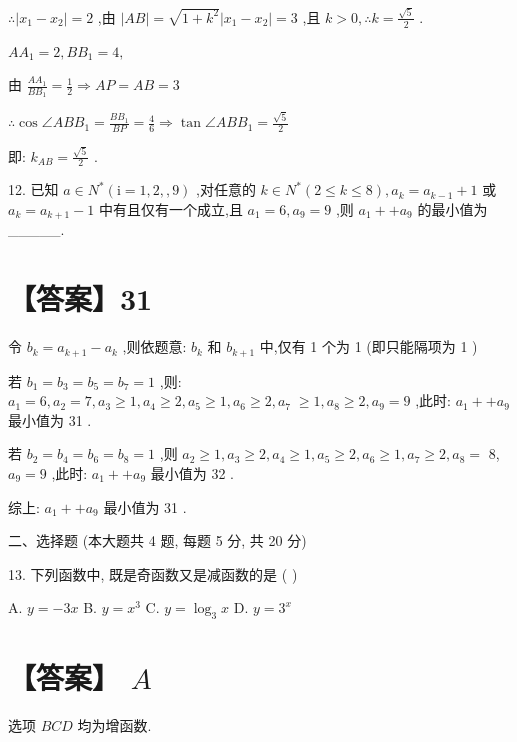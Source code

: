 \documentclass[10pt]{article}
\begin{document}
\(\therefore \left| {{x}_{1} - {x}_{2}}\right|  = 2\) ,由 \(\left| {AB}\right|  = \sqrt{1 + {k}^{2}}\left| {{x}_{1} - {x}_{2}}\right|  = 3\) ,且 \(k > 0,\therefore k = \frac{\sqrt{5}}{2}\) .

\(A{A}_{1} = 2,B{B}_{1} = 4,\)

由 \(\frac{A{A}_{1}}{B{B}_{1}} = \frac{1}{2} \Rightarrow  {AP} = {AB} = 3\)

\(\therefore \cos \angle {AB}{B}_{1} = \frac{B{B}_{1}}{BP} = \frac{4}{6} \Rightarrow  \tan \angle {AB}{B}_{1} = \frac{\sqrt{5}}{2}\)

即: \({k}_{AB} = \frac{\sqrt{5}}{2}\) .

12. 已知 \(a \in  {N}^{ * }\left( {\mathrm{i} = 1,2,,9}\right)\) ,对任意的 \(k \in  {N}^{ * }\left( {2 \leq  k \leq  8}\right) ,{a}_{k} = {a}_{k - 1} + 1\) 或 \({a}_{k} = {a}_{k + 1} - 1\) 中有且仅有一个成立,且 \({a}_{1} = 6,{a}_{9} = 9\) ,则 \({a}_{1} +  + {a}_{9}\) 的最小值为\_\_\_\_\_.

\section*{【答案】31}

令 \({b}_{k} = {a}_{k + 1} - {a}_{k}\) ,则依题意: \({b}_{k}\) 和 \({b}_{k + 1}\) 中,仅有 1 个为 1 (即只能隔项为 1 )

若 \({b}_{1} = {b}_{3} = {b}_{5} = {b}_{7} = 1\) ,则: \({a}_{1} = 6,{a}_{2} = 7,{a}_{3} \geq  1,{a}_{4} \geq  2,{a}_{5} \geq  1,{a}_{6} \geq  2,{a}_{7} \; \geq  1,{a}_{8} \geq  2,{a}_{9} = 9\) ,此时: \({a}_{1} +  + {a}_{9}\) 最小值为 31 .

若 \({b}_{2} = {b}_{4} = {b}_{6} = {b}_{8} = 1\) ,则 \({a}_{2} \geq  1,{a}_{3} \geq  2,{a}_{4} \geq  1,{a}_{5} \geq  2,{a}_{6} \geq  1,{a}_{7} \geq  2,{a}_{8} =\) 8, \({a}_{9} = 9\) ,此时: \({a}_{1} +  + {a}_{9}\) 最小值为 32 .

综上: \({a}_{1} +  + {a}_{9}\) 最小值为 31 .

二、选择题 (本大题共 4 题, 每题 5 分, 共 20 分)

13. 下列函数中, 既是奇函数又是减函数的是 ( )

A. \(y =  - {3x}\) B. \(y = {x}^{3}\) C. \(y = {\log }_{3}x\) D. \(y = {3}^{x}\)

\section*{【答案】 \(A\)}

选项 \({BCD}\) 均为增函数.
\end{document}

